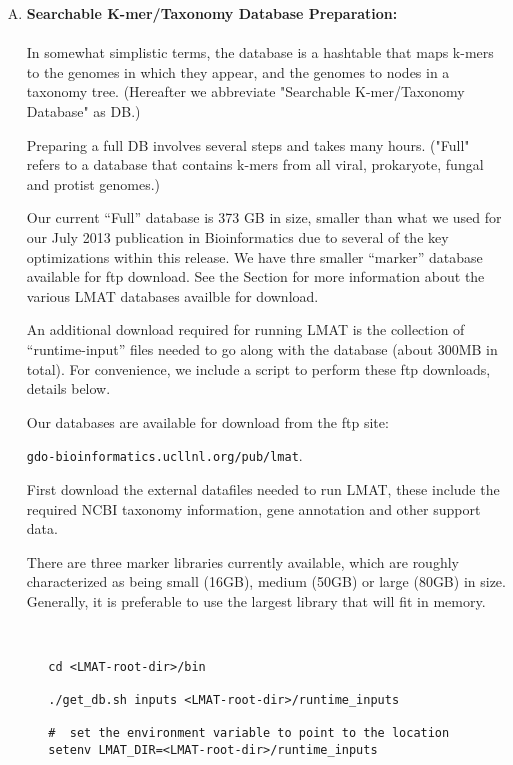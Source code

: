 \documentclass[11pt]{article}
\begin{document}
\begin{enumerate}[A.]
\label{sec:over-a}

   \item 
{
   {\bf Searchable K-mer/Taxonomy Database Preparation:}\\
   \\
    In somewhat simplistic 
     terms, the database is a hashtable that maps k-mers to the genomes in which they
     appear, and the genomes to nodes in a taxonomy tree. (Hereafter
     we abbreviate "Searchable K-mer/Taxonomy Database" as DB.)

     Preparing a full DB involves several steps and takes many hours. 
     ("Full" refers to a database that contains k-mers from
     all viral, prokaryote, fungal and protist genomes.)

     Our current ``Full'' database is 373 GB in size, smaller than
     what we used for our July 2013 publication in Bioinformatics due
     to several of the key optimizations within this release.  We have
     thre smaller ``marker'' database available for ftp download.  See
     the  Section for more information about
     the various LMAT databases availble for download.

     An additional download required for running LMAT is the
     collection of ``runtime-input'' files needed to go along with the
     database (about 300MB in total).  For convenience, we include a
     script to perform these ftp downloads, details below.
     

Our databases are available for download from the ftp site:

     \texttt{gdo-bioinformatics.ucllnl.org/pub/lmat}.  


   First download the external datafiles needed to run LMAT, these include the required NCBI taxonomy information, gene annotation and other support data.

   There are three marker libraries currently available, which are
   roughly characterized as being small (16GB), medium (50GB) or large
   (80GB) in size.  Generally, it is preferable to use the largest
   library that will fit in memory.


\begin{verbatim}


   cd <LMAT-root-dir>/bin

   ./get_db.sh inputs <LMAT-root-dir>/runtime_inputs

   #  set the environment variable to point to the location
   setenv LMAT_DIR=<LMAT-root-dir>/runtime_inputs


\end{verbatim}}
\end{enumerate}
\end{document}
